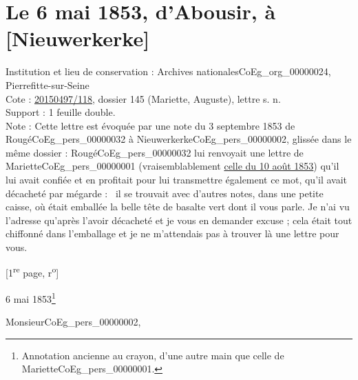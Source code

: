 \documentclass{book}
\begin{document}
\section*{Le 6 mai 1853, d'Abousir, à [Nieuwerkerke]} \label{CoEg_Mariette_1853-05-06} 
{\footnotesize
\noindent Institution et lieu de conservation : Archives nationales\gls{CoEg_org_00000024}, Pierrefitte-sur-Seine\\
Cote : \hyperref[CoEg_Mariette_ms_001]{20150497/118}, dossier 145 (Mariette, Auguste), lettre s. n.\\
Support : 1 feuille double.\\
Note : Cette lettre est évoquée par une note du 3 septembre 1853 de Rougé\gls{CoEg_pers_00000032} à Nieuwerkerke\gls{CoEg_pers_00000002}, glissée dans le même dossier : Rougé\gls{CoEg_pers_00000032} lui renvoyait une lettre de Mariette\gls{CoEg_pers_00000001} (vraisemblablement \hyperref[CoEg_Mariette_1853-08-10]{celle du 10 août 1853}) qu'il lui avait confiée et en profitait pour lui transmettre également ce mot, qu'il avait décacheté par mégarde : \og ~il se trouvait avec d’autres notes, dans une petite caisse, où était emballée la belle tête de basalte vert dont il vous parle. Je n’ai vu l’adresse qu’après l’avoir décacheté et je vous en demander excuse ; cela était tout chiffonné dans l’emballage et je ne m’attendais pas à trouver là une lettre pour vous.~\fg
\begin{center} {[1\textsuperscript{re} page, r\textsuperscript{o}]}\end{center}}
\begin{flushright}6 mai 1853\footnote{Annotation ancienne au crayon, d'une autre main que celle de Mariette\gls{CoEg_pers_00000001}.}\end{flushright}

\hspace{1cm} Monsieur\gls{CoEg_pers_00000002},\\
\end{document}
